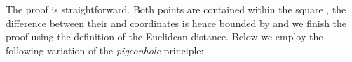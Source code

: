 \begin{isabellebody}
\begin{isamarkuptext}
\begin{lemma} \label{lemma:max_dist_square}
 \vskip 0pt
 \vskip 0pt
\end{lemma}

The proof is straightforward. Both points are contained within the square , the difference between
their  and  coordinates is hence bounded by \isa{{\isasymdelta}} and we finish the proof using the definition of the Euclidean
distance. Below we employ the following variation of the \textit{pigeonhole} principle:

\begin{lemma} \label{lemma:pigeonhole}
  \vskip 0pt
\end{lemma}


\end{isamarkuptext}
\end{isabellebody}
